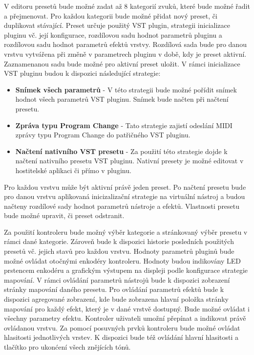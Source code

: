 \documentclass[thesis=M,czech]{FITthesis}[2019/03/06]
\begin{document}
		V editoru presetů bude možné zadat až 8 kategorií zvuků, které bude možné řadit a přejmenovat.
		Pro každou kategorii bude možné přidat nový preset, či duplikovat stávající. Preset určuje použitý VST plugin,
		strategii inicializace pluginu vč. její konfigurace, rozdílovou sadu hodnot parametrů pluginu a rozdílovou sadu hodnot parametrů efektů vrstvy.
		Rozdílová sada bude pro danou vrstvu vytvářena při změně v parametrech pluginu v době, kdy je preset aktivní. Zaznamenanou sadu bude možné pro aktivní preset uložit.
		V rámci inicializace VST pluginu budou k dispozici následující strategie:
		\begin{itemize}
			\item \textbf{Snímek všech parametrů} - V této strategii bude možné pořídit snímek hodnot všech parametrů VST pluginu. Snímek bude načten při načtení presetu.
			\item \textbf{Zpráva typu Program Change} - Tato strategie zajistí odeslání MIDI zprávy typu Program Change do patřičného VST pluginu.
			\item \textbf{Načtení nativního VST presetu} - Za použití této strategie dojde k načtení nativního presetu VST pluginu. Nativní presety je možné editovat
			v hostitelské aplikaci či přímo v pluginu.
		\end{itemize}
		Pro každou vrstvu může být aktivní právě jeden preset. Po načtení presetu bude 
		pro danou vrstvu aplikovaná inicizalizační strategie na virtuální nástroj a budou načteny rozdílové sady hodnot parametrů nástroje a efektů.
		Vlastnosti presetu bude možné upravit, či preset odstranit.
	
		Za použití kontroleru bude možný výběr kategorie a stránkovaný výběr presetu v rámci dané kategorie. Zároveň bude k dispozici
		historie posledních použitých presetů vč. jejich stavů pro každou vrstvu.
		Hodnoty parametrů pluginů bude možné ovládat otočnými enkodéry kontroleru. Hodnoty budou indikovány LED prstencem enkodéru a grafickým výstupem na displeji podle konfigurace strategie mapování.
		V rámci ovládání parametrů nástrojů bude k dispozici
		zobrazení stránky mapování daného presetu. Pro ovládání parametrů efektů bude k dispozici agregované zobrazení, kde bude zobrazena
		hlavní položka stránky mapování pro každý efekt, který je v dané vrstvě dostupný. Bude možné ovládat i všechny parametry efektu.
		Kontroler uživateli umožní přepínat a indikovat právě ovládanou vrstvu. 
		Za pomocí posuvných prvků kontroleru bude možné ovládat hlasitosti jednotlivých vrstev.
		K dispozici bude též ovládání hlavní hlasitosti a tlačítko pro ukonćení všech znějících tónů.
	
\end{document}
